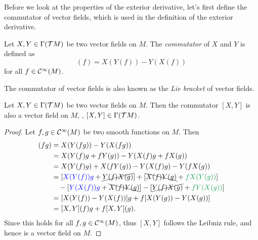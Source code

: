 Before we look at the properties of the exterior derivative, let's first define the commutator of vector fields, which is used in the definition of the exterior derivative.
\begin{definition} \label{def:commutator-of-vector-fields}
    Let \(X, Y \in \Gamma(\mathcal T M)\) be two vector fields on \(M\). The \emph{commutator} of \(X\) and \(Y\) is defined as
    \begin{equation*}
        [X, Y](f) = X(Y(f)) - Y(X(f))
    \end{equation*}
    for all \(f \in \mathcal C^\infty(M)\).
\end{definition}
The commutator of vector fields is also known as the \emph{Lie bracket} of vector fields.
\begin{proposition}
    Let \(X, Y \in \Gamma(\mathcal T M)\) be two vector fields on \(M\). Then the commutator \([X, Y]\) is also a vector field on \(M\), \ie, \([X, Y] \in \Gamma(\mathcal T M)\).
\end{proposition}
\begin{proof}
    Let \(f, g \in \mathcal C^\infty(M)\) be two smooth functions on \(M\). Then
    \begin{align*}
        [X, Y](f g) & = X(Y(f g)) - Y(X(f g))                                                                                                 \\
                    & = X(Y(f) g + f Y(g)) - Y(X(f) g + f X(g))                                                                               \\
                    & = X(Y(f) g) + X(f Y(g)) - Y(X(f) g) - Y(f X(g))                                                                         \\
                    & = [\textcolor{blue}{X(Y(f)) g} + \cancel{Y(f) X(g)}] + [\bcancel{X(f) Y(g)} + \textcolor{ForestGreen}{f X(Y(g))}]       \\
                    & \quad - [\textcolor{blue}{Y(X(f)) g} + \bcancel{X(f) Y(g)}] - [\cancel{Y(f) X(g)} + \textcolor{ForestGreen}{f Y(X(g))}] \\
                    & = [X(Y(f)) - Y(X(f))] g + f [X(Y(g)) - Y(X(g))]                                                                         \\
                    & = [X, Y](f) g + f [X, Y](g).
    \end{align*}
    Since this holds for all \(f, g \in \mathcal C^\infty(M)\), thus \([X, Y]\) follows the Leibniz rule, and hence is a vector field on \(M\).
\end{proof}
